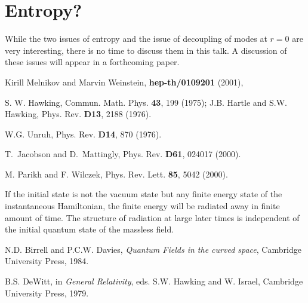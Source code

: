 \documentclass[12pt]{article}
\begin{document}
\section{Entropy?}

While the two issues of entropy and the issue of decoupling of modes at $r=0$ are
very interesting, there is no time to discuss them in this talk.  A discussion
of these issues will appear in a forthcoming paper.


\begin{thebibliography}{10}

Kirill Melnikov and Marvin Weinstein, {\bf hep-th/0109201} (2001),

S. W. Hawking, Commun. Math. Phys. {\bf 43}, 199 (1975); J.B. Hartle 
and S.W. Hawking, Phys. Rev. {\bf D13}, 2188 (1976).

 W.G. Unruh, Phys. Rev. {\bf D14}, 870 (1976).

T.~Jacobson and D.~Mattingly,
Phys. Rev.  {\bf D61}, 024017 (2000).

 M. Parikh and F. Wilczek, Phys. Rev. Lett. {\bf 85}, 
5042 (2000).

  If the initial state is not the vacuum state but 
any finite energy state of the instantaneous Hamiltonian, the 
finite energy will be radiated away in finite amount of time.
The structure of radiation at large later times is independent 
of the initial quantum state of the massless field. 


 N.D. Birrell  and P.C.W. Davies, {\it Quantum Fields
in the curved space}, Cambridge University Press, 1984.

 B.S. DeWitt, in {\it General Relativity}, eds. S.W. Hawking 
and W. Israel, Cambridge University Press, 1979.

\end{thebibliography}
\end{document}
